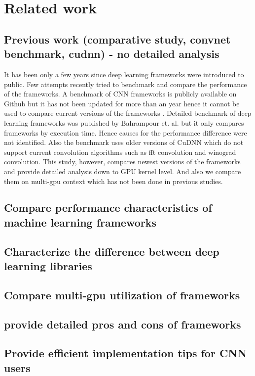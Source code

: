 \documentclass[conference]{IEEEtran}
\begin{document}
\section{Related work}

\subsection{Previous work (comparative study, convnet benchmark, cudnn) - no detailed analysis}
It has been only a few years since deep learning frameworks were introduced to public.
Few attempts recently tried to benchmark and compare the performance of the frameworks.
A benchmark of CNN frameworks is publicly available on Github but it has not been updated for more than an year hence it cannot be used to compare current versions of the frameworks \cite{}.
Detailed benchmark of deep learning frameworks was published by Bahrampour et. al. but it only compares frameworks by execution time.
Hence causes for the performance difference were not identified.
Also the benchmark uses older versions of CuDNN which do not support current convolution algorithms such as fft convolution and winograd convolution.
This study, however, compares newest versions of the frameworks and provide detailed analysis down to GPU kernel level.
And also we compare them on multi-gpu context which has not been done in previous studies.

\subsection{Compare performance characteristics of machine learning frameworks}

\subsection{Characterize the difference between deep learning libraries}

\subsection{Compare multi-gpu utilization of frameworks}

\subsection{provide detailed pros and cons of frameworks}

\subsection{Provide efficient implementation tips for CNN users}
\end{document}
